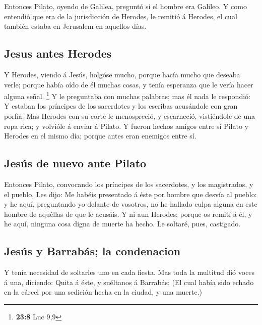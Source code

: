  Entonces Pilato, oyendo de Galilea, preguntó si el hombre
era Galileo.  Y como entendió que era de la jurisdicción de
Herodes, le remitió á Herodes, el cual también estaba en Jerusalem en
aquellos días.

\hypertarget{jesus-antes-herodes}{%
\subsection{Jesus antes Herodes}\label{jesus-antes-herodes}}

 Y Herodes, viendo á Jesús, holgóse mucho, porque hacía
mucho que deseaba verle; porque había oído de él muchas cosas, y tenía
esperanza que le vería hacer alguna señal. \footnote{\textbf{23:8} Luc
  9,9}  Y le preguntaba con muchas palabras; mas él nada le
respondió:  Y estaban los príncipes de los sacerdotes y los
escribas acusándole con gran porfía.  Mas Herodes con su
corte le menospreció, y escarneció, vistiéndole de una ropa rica; y
volvióle á enviar á Pilato.  Y fueron hechos amigos entre
sí Pilato y Herodes en el mismo día; porque antes eran enemigos entre
sí.

\hypertarget{jesuxfas-de-nuevo-ante-pilato}{%
\subsection{Jesús de nuevo ante
Pilato}\label{jesuxfas-de-nuevo-ante-pilato}}

 Entonces Pilato, convocando los príncipes de los
sacerdotes, y los magistrados, y el pueblo,  Les dijo: Me
habéis presentado á éste por hombre que desvía al pueblo: y he aquí,
preguntando yo delante de vosotros, no he hallado culpa alguna en este
hombre de aquéllas de que le acusáis.  Y ni aun Herodes;
porque os remití á él, y he aquí, ninguna cosa digna de muerte ha hecho.
 Le soltaré, pues, castigado.

\hypertarget{jesuxfas-y-barrabuxe1s-la-condenacion}{%
\subsection{Jesús y Barrabás; la
condenacion}\label{jesuxfas-y-barrabuxe1s-la-condenacion}}

 Y tenía necesidad de soltarles uno en cada fiesta.
 Mas toda la multitud dió voces á una, diciendo: Quita á
éste, y suéltanos á Barrabás:  (El cual había sido echado
en la cárcel por una sedición hecha en la ciudad, y una muerte.)

